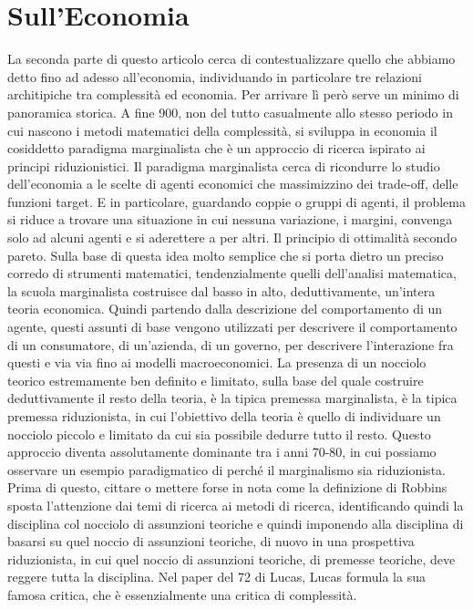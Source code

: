 \documentclass[a4paper, headings=standardclasses]{scrartcl}
\begin{document}
\section{Sull'Economia}
La seconda parte di questo articolo cerca di contestualizzare quello che abbiamo detto
fino ad adesso all'economia, individuando in particolare tre relazioni architipiche
tra complessità ed economia. Per arrivare lì però serve un minimo di panoramica storica.
A fine 900, non del tutto casualmente allo stesso periodo in cui nascono i metodi matematici
della complessità, si sviluppa in economia il cosiddetto paradigma marginalista che è
un approccio di ricerca ispirato ai principi riduzionistici. Il paradigma marginalista
cerca di ricondurre lo studio dell'economia a le scelte di agenti economici che massimizzino
dei trade-off, delle funzioni target. E in particolare, guardando coppie o gruppi di agenti,
il problema si riduce a trovare una situazione in cui nessuna variazione, i margini, convenga
solo ad alcuni agenti e si aderettere a per altri. Il principio di ottimalità secondo pareto.
Sulla base di questa idea molto semplice che si porta dietro un preciso corredo di strumenti
matematici, tendenzialmente quelli dell'analisi matematica, la scuola marginalista costruisce
dal basso in alto, deduttivamente, un'intera teoria economica. Quindi partendo dalla descrizione
del comportamento di un agente, questi assunti di base vengono utilizzati per descrivere il
comportamento di un consumatore, di un'azienda, di un governo, per descrivere l'interazione fra
questi e via via fino ai modelli macroeconomici. La presenza di un nocciolo teorico estremamente
ben definito e limitato, sulla base del quale costruire deduttivamente il resto della teoria,
è la tipica premessa marginalista, è la tipica premessa riduzionista, in cui l'obiettivo della
teoria è quello di individuare un nocciolo piccolo e limitato da cui sia possibile dedurre tutto il
resto. Questo approccio diventa assolutamente dominante tra i anni 70-80, in cui possiamo
osservare un esempio paradigmatico di perché il marginalismo sia riduzionista. Prima di questo,
cittare o mettere forse in nota come la definizione di Robbins sposta l'attenzione
dai temi di ricerca ai metodi di ricerca, identificando quindi la disciplina col nocciolo
di assunzioni teoriche e quindi imponendo alla disciplina di basarsi su quel noccio
di assunzioni teoriche, di nuovo in una prospettiva riduzionista, in cui quel noccio di assunzioni
teoriche, di premesse teoriche, deve reggere tutta la disciplina. Nel paper del 72 di Lucas,
Lucas formula la sua famosa critica, che è essenzialmente una critica di complessità.
\end{document}
